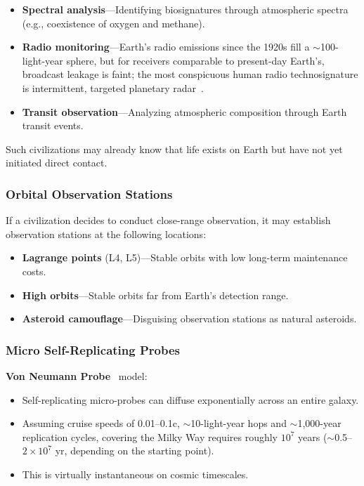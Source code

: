 \documentclass[aps,prd,twocolumn,superscriptaddress,nofootinbib]{revtex4-2}
\begin{document}
\begin{itemize}
  \item \textbf{Spectral analysis}---Identifying biosignatures through atmospheric spectra (e.g., coexistence of oxygen and methane).
  \item \textbf{Radio monitoring}---Earth's radio emissions since the 1920s fill a ${\sim}$100-light-year sphere, but for receivers comparable to present-day Earth's, broadcast leakage is faint; the most conspicuous human radio technosignature is intermittent, targeted planetary radar~\cite{Sheikh2025}.
  \item \textbf{Transit observation}---Analyzing atmospheric composition through Earth transit events.
\end{itemize}

Such civilizations may already know that life exists on Earth but have not yet initiated direct contact.

\subsubsection{Orbital Observation Stations}\label{sec:orbital-stations}

If a civilization decides to conduct close-range observation, it may establish observation stations at the following locations:

\begin{itemize}
  \item \textbf{Lagrange points} (L4, L5)---Stable orbits with low long-term maintenance costs.
  \item \textbf{High orbits}---Stable orbits far from Earth's detection range.
  \item \textbf{Asteroid camouflage}---Disguising observation stations as natural asteroids.
\end{itemize}

\subsubsection{Micro Self-Replicating Probes}\label{sec:von-neumann}

\textbf{Von Neumann Probe}~\cite{Freitas1980} model:

\begin{itemize}
  \item Self-replicating micro-probes can diffuse exponentially across an entire galaxy.
  \item Assuming cruise speeds of 0.01--0.1c, ${\sim}$10-light-year hops and ${\sim}$1,000-year replication cycles, covering the Milky Way requires roughly $10^{7}$ years (${\sim}$0.5--$2\times10^{7}$ yr, depending on the starting point).
  \item This is virtually instantaneous on cosmic timescales.
\end{itemize}
\end{document}

